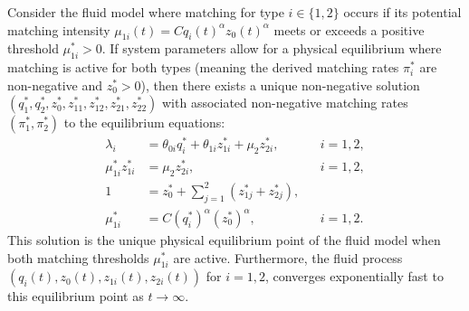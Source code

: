 \begin{theorem} \label{thm:EC4}
Consider the fluid model where matching for type $i \in \{1,2\}$ occurs if its potential matching intensity $\mu_{1i}(t) = C q_i(t)^{\alpha} z_0(t)^{\alpha}$ meets or exceeds a positive threshold $\mu_{1i}^* > 0$.
If system parameters allow for a physical equilibrium where matching is active for both types (meaning the derived matching rates $\pi_i^*$ are non-negative and $z_0^* > 0$), then there exists a unique non-negative solution $(q_1^*, q_2^*, z_0^*, z_{11}^*, z_{12}^*, z_{21}^*, z_{22}^*)$ with associated non-negative matching rates $(\pi_1^*, \pi_2^*)$ to the equilibrium equations:
\begin{align}
\lambda_i &= \theta_{0i}q_i^* + \theta_{1i}z_{1i}^* + \mu_2z_{2i}^*, && i=1,2, \label{eq:thm_eq_1} \\
\mu_{1i}^*z_{1i}^* &= \mu_2z_{2i}^*, && i=1,2, \label{eq:thm_eq_2} \\
1 &= z_0^* + \sum_{j=1}^{2}(z_{1j}^* + z_{2j}^*), && \label{eq:thm_eq_3} \\
\mu_{1i}^* &= C (q_i^*)^{\alpha} (z_0^*)^{\alpha} , && i=1,2. \label{eq:thm_eq_4}
\end{align}
This solution is the unique physical equilibrium point of the fluid model when both matching thresholds $\mu_{1i}^*$ are active.
Furthermore, the fluid process $(q_i(t), z_0(t), z_{1i}(t), z_{2i}(t))$ for $i=1,2$, converges exponentially fast to this equilibrium point as $t \to \infty$.
\end{theorem}

